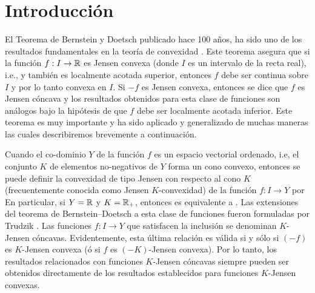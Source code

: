 \chapter*{Introducción}


El Teorema de Bernstein y Doetsch \cite{BerDoe15} publicado hace 100 años, ha sido uno de los
resultados fundamentales en la teoría de convexidad
\cite{Kuc09}. Este teorema asegura que si la funci\'on $f:I\to\mathbb{R}$ es 
Jensen convexa (donde $I$ es un intervalo de la recta real), i.e.,
y también es localmente acotada superior, entonces $f$ debe ser continua
sobre $I$ y por lo tanto convexa en $I$. 
Si $-f$ es Jensen convexa, entonces se dice que $f$ es Jensen cóncava y los resultados obtenidos
para esta clase de funciones son análogos bajo la hipótesis de que $f$ debe ser localmente
acotada inferior. Este teorema es muy importante y ha sido aplicado y generalizado de muchas maneras
las cuales describiremos brevemente a continuación.

Cuando el co-dominio $Y$ de la función $f$ es un espacio vectorial ordenado, 
i.e, el conjunto $K$ de elementos
no-negativos de $Y$ forma un cono convexo, entonces se puede definir la convexidad de tipo Jensen 
con respecto al cono $K$ (frecuentemente conocida como Jensen $K$-convexidad) de la función
$f:I\to Y$ por
En particular, si $Y=\mathbb{R}$ y $K=\mathbb{R}_+$, entonces  es equivalente a . 
Las extensiones del teorema de Bernstein--Doetsch a esta clase de funciones fueron formuladas por
Trudzik \cite{Tru84}. Las funciones $f:I\to Y$ que satisfacen la inclusión
se denominan $K$-Jensen cóncavas. Evidentemente, esta última relación es válida si y sólo
si $(-f)$ es $K$-Jensen convexa (ó si $f$ es $(-K)$-Jensen convexa). 
Por lo tanto, los resultados relacionados con funciones $K$-Jensen cóncavas siempre pueden
ser obtenidos directamente de los resultados establecidos para funciones $K$-Jensen convexas.

